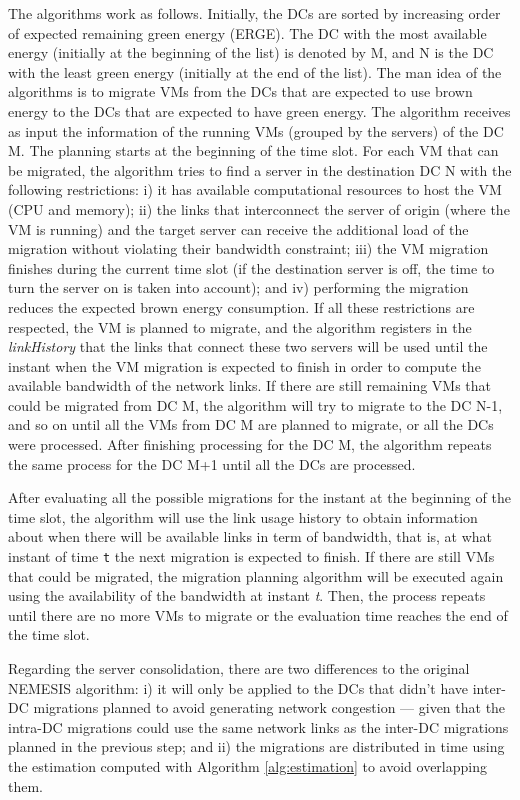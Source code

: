 The algorithms work as follows. Initially, the DCs are sorted by increasing order of expected remaining green energy (ERGE). The DC with the most available energy (initially at the beginning of the list) is denoted by M, and N is the DC with the least green energy (initially at the end of the list). The man idea of the algorithms is to migrate VMs from the DCs that are expected to use brown energy to the DCs that are expected to have green energy.  The algorithm receives as input the information of the running VMs (grouped by the servers) of the DC M. The planning starts at the beginning of the time slot. For each VM that can be migrated, the algorithm tries to find a server in the destination DC N with the following restrictions: i) it has available computational resources to host the VM (CPU and memory); ii) the links that interconnect the server of origin (where the VM is running) and the target server can receive the additional load of the migration without violating their bandwidth constraint; iii) the VM migration finishes during the current time slot (if the destination server is off, the time to turn the server on is taken into account); and iv) performing the migration reduces the expected brown energy consumption. If all these restrictions are respected, the VM is planned to migrate, and the algorithm registers in the \textit{linkHistory} that the links that connect these two servers will be used until the instant when the VM migration is expected to finish in order to compute the available bandwidth of the network links. If there are still remaining VMs that could be migrated from DC M, the algorithm will try to migrate to the DC N-1, and so on until all the VMs from DC M are planned to migrate, or all the DCs were processed. After finishing processing for the DC M, the algorithm repeats the same process for the DC M+1 until all the DCs are processed. 

After evaluating all the possible migrations for the instant at the beginning of the time slot, the algorithm will use the link usage history to obtain information about when there will be available links in term of bandwidth, that is, at what instant of time \texttt{t} the next migration is expected to finish.  If there are still VMs that could be migrated, the migration planning algorithm will be executed again using the availability of the bandwidth at instant \textit{t}. Then, the process repeats until there are no more VMs to migrate or the evaluation time reaches the end of the time slot.

Regarding the server consolidation, there are two differences to the original NEMESIS algorithm: i) it will only be applied to the DCs that didn't have inter-DC migrations planned to avoid generating network congestion --- given that the intra-DC migrations could use the same network links as the inter-DC migrations planned in the previous step; and ii) the migrations are distributed in time using the estimation computed with Algorithm \ref{alg:estimation} to avoid overlapping them.

